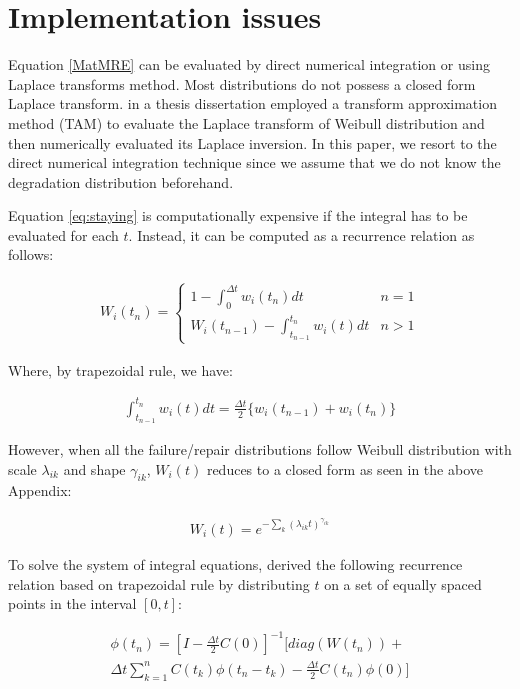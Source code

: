 \section{Implementation issues}
\label{sec:PipingImplementation}

Equation \ref{MatMRE} can be evaluated by direct numerical integration or using Laplace transforms method. Most distributions do not possess a closed form Laplace transform. \cite{Gulyas2007} in a thesis dissertation employed a transform approximation method (TAM) to evaluate the Laplace transform of Weibull distribution and then numerically evaluated its Laplace inversion. In this paper, we resort to the direct numerical integration technique since we assume that we do not know the degradation distribution beforehand.

Equation \ref{eq:staying} is computationally expensive if the integral has to be evaluated for each $t$. Instead, it can be computed as a recurrence relation as follows:

\begin{align}
W_i(t_n)=\begin{cases}
1 - \int_0 ^ {\Delta t} {w_i(t_n) dt} & n=1 \\
W_i(t_{n-1}) -\int_{t_{n-1}}^{t_n} { w_i(t) dt}    & n > 1
\end{cases}
\end{align}


Where, by trapezoidal rule, we have:

\begin{align}
\int_{t_{n-1}}^{t_n} {w_i(t)}dt = \frac{\Delta t}{2}\{  w_i(t_{n-1}) + w_i(t_n)  \} 
\end{align}

However, when all the failure/repair distributions follow Weibull distribution with scale $\lambda_{ik}$  and shape $\gamma_{ik}$, $W_i(t)$ reduces to a closed form as seen in the above Appendix:

\begin{align}
W_i(t) =  e^{-\sum\limits_{k}{(\lambda_{ik}t)^{\gamma_{ik}}}}
\end{align}

To solve the system of integral equations, \cite{Nunn1977} derived the following recurrence relation based on trapezoidal rule by distributing $t$ on a set of equally spaced points in the interval $[0,t]$:

\begin{eqnarray}
{\phi (t_n )} = [I - \frac{{\Delta t}}{2}C(0)]^{ - 1} [diag(W(t_n )) + \nonumber \\
\Delta t\sum\limits_{k = 1}^n {C(t_k ){\phi (t_n  - t_k )}}  - \frac{{\Delta t}}{2}C(t_n ){\phi (0)}]
\label{TrapCTMRE}
\end{eqnarray}

